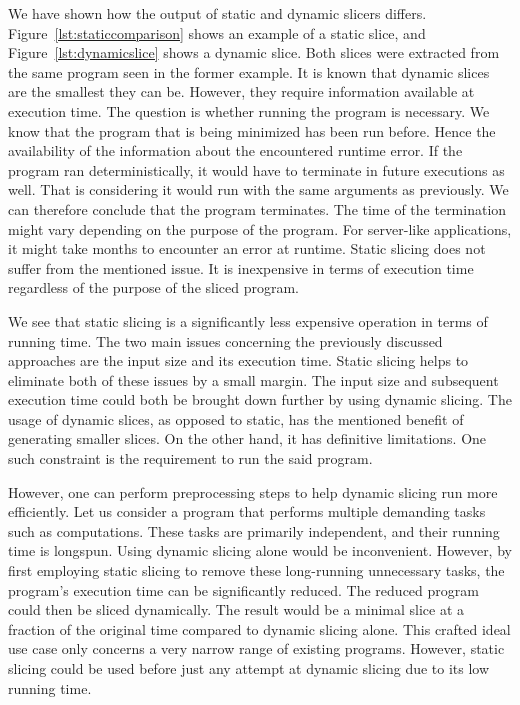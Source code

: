 We have shown how the output of static and dynamic slicers differs. 
Figure~\ref{lst:staticcomparison} shows an example of a static slice, 
and Figure~\ref{lst:dynamicslice} shows a dynamic slice. 
Both slices were extracted from the same program seen in the former example.
It is known that dynamic slices are the smallest they can be. 
However, they require information available at execution time. 
The question is whether running the program is necessary. 
We know that the program that is being minimized has been run before. 
Hence the availability of the information about the encountered runtime 
error. 
If the program ran deterministically, it would have to terminate in future 
executions as well.  
That is considering it would run with the same arguments as previously.  
We can therefore conclude that the program terminates.  
The time of the termination might vary depending on the purpose of 
the program.  
For server-like applications, it might take months to encounter an error 
at runtime. 
Static slicing does not suffer from the mentioned issue.  
It is inexpensive in terms of execution time regardless of the purpose of 
the sliced program. 

We see that static slicing is a significantly less expensive operation in 
terms of running time. 
The two main issues concerning the previously discussed approaches are 
the input size and its execution time.
Static slicing helps to eliminate both of these issues by a small margin. 
The input size and subsequent execution time could both be brought down 
further by using dynamic slicing.  
The usage of dynamic slices, as opposed to static, has the mentioned benefit 
of generating smaller slices.
On the other hand, it has definitive limitations. 
One such constraint is the requirement to run the said program. 

However, one can perform preprocessing steps to help dynamic slicing run more 
efficiently.  
Let us consider a program that performs multiple demanding tasks such as 
computations.  
These tasks are primarily independent, and their running time is longspun.  
Using dynamic slicing alone would be inconvenient.  
However, by first employing static slicing to remove these long-running 
unnecessary tasks, the program's execution time can be significantly reduced.  
The reduced program could then be sliced dynamically.  
The result would be a minimal slice at a fraction of the original time 
compared to dynamic slicing alone. 
This crafted ideal use case only concerns a very narrow range of existing 
programs.  
However, static slicing could be used before just any attempt at dynamic 
slicing due to its low running time. 

